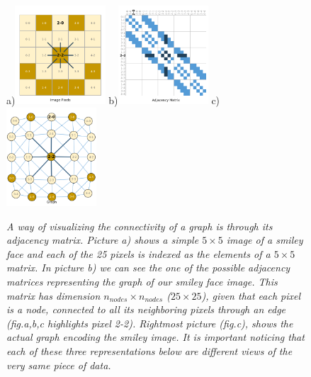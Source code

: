 \documentclass[binding=0.6cm]{sapthesis}
\begin{document}
\begin{figure}
    \centering
    \footnotesize a)\includegraphics[width=0.3\textwidth]{imgs/background/smile-graph-01.png}
    \footnotesize b)\includegraphics[width=0.3\textwidth]{imgs/background/smile-graph-02.png}
    \footnotesize c)\includegraphics[width=0.3\textwidth]{imgs/background/smile-graph-03.png}
    \caption{\textit{A way of visualizing the connectivity of a graph is through its adjacency matrix. Picture a) shows a simple $5\times5$ image of a smiley face and each of the 25 pixels is indexed as the elements of a $5\times5$ matrix. In picture b) we can see the one of the possible adjacency matrices representing the graph of our smiley face image. This matrix has dimension $n_{nodes}\times n_{nodes}$ ($25\times25$), given that each pixel is a node, connected to all its neighboring pixels through an edge (fig.a,b,c highlights pixel 2-2). Rightmost picture (fig.c), shows the actual graph encoding the smiley image. It is important noticing that each of these three representations below are different views of the very same piece of data.}}
    \label{fig:bg.graph_smile}
\end{figure}
\end{document}
